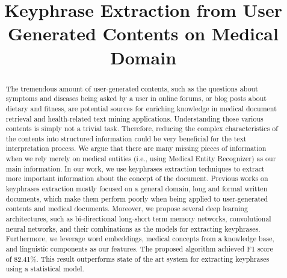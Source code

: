 \documentclass[sigconf]{acmart}
\begin{document}
	
	\title{Keyphrase Extraction from User Generated Contents on Medical Domain}
	\iffalse
	\titlenote{Produces the permission block, and
		copyright information}
	\subtitle{Extended Abstract}
	\subtitlenote{The full version of the author's guide is available as
		\texttt{acmart.pdf} document}
	\fi
	
	
	
	\begin{abstract}
		The tremendous amount of user-generated contents, such as the questions about symptoms and diseases being asked by a user in online forums, or blog posts about dietary and fitness, are potential sources for enriching knowledge in medical document retrieval and health-related text mining applications. Understanding those various contents is simply not a trivial task. Therefore, reducing the complex characteristics of the contents into structured information could be very beneficial for the text interpretation process. We argue that there are many missing pieces of information when we rely merely on medical entities (i.e., using Medical Entity Recognizer) as our main information. In our work, we use keyphrases extraction techniques to extract more important information about the concept of the document. Previous works on keyphrases extraction mostly focused on a general domain, long and formal written documents, which make them perform poorly when being applied to user-generated contents and medical documents. Moreover, we propose several deep learning architectures, such as bi-directional long-short term memory networks, convolutional neural networks, and their combinations as the models for extracting keyphrases. Furthermore, we leverage word embeddings, medical concepts from a knowledge base, and linguistic components as our features. The proposed algorithm achieved F1 score of 82.41\%. This result outperforms state of the art system for extracting keyphrases using a statistical model.
	\end{abstract}
	
	
	
	
	
	\maketitle
	
\end{document}
